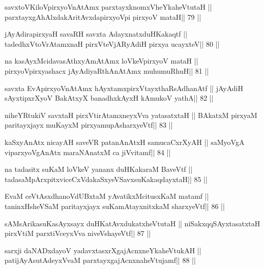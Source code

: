 \begin{shl}
savxtoV\s KiloV\s pirxyoV\s nAtAmx parxtayxknomxVheYkaheVtutaH ||
parxtayxgAhAlxdakAritAvxdapirxyoV\s pi pirxyoV mataH\hfill || 79 ||
\end{shl}

\begin{shl}
jAyAdirapirxyaH savaRH savxta AdayxnatxduHKakaqtf ||
tadedhxVtoVrAtamxnaH pirxVteVjARyAdiH pirxya ucayxteV\hfill || 80 ||
\end{shl}

\begin{shl}
na kasAyxMcidavasAthxyAmAtAmx loVkeV\s pirxyoV mataH ||
pirxyoV\s pirxyashacx jAyAdiyaRthA\s nAtAmx muhumuRhuH\hfill || 81 ||
\end{shl}

\begin{shl}
savxta EvApirxyoV\s nAtAmx hAyxtamxpirxVtayxthaRsAdhanAtf ||
jAyAdiH sAyxtipxrXyoV BakAtxyX banadhxkAyxH kAmukoV yathA\hfill || 82 ||
\end{shl}

\begin{shl}
niheYRtukiV savxtaH pirxVtirAtamxneyxVva yatasatxtaH ||
BAkatxM pirxyaM paritayxjayx muKayxM pirxyamupAsharxyeVtf\hfill || 83 ||
\end{shl}

\begin{shl}
kaSxyAnAtx nicayAH saveVR patanAnAtxH samucaCxrXyAH ||
saMyoVgA viparxyoVgAnAtx maraNAnatxM ca jiVvitamf\hfill || 84 ||
\end{shl}

\begin{shl}
na tadasitx suKaM loVkeV yananx duHKakaraM BaveVtf ||
tadasaMpArxpitxviceCxVdakaSxyeVSavxsuKakaqdayxtaH\hfill || 85 ||
\end{shl}

\begin{shl}
EvaM ceVtAsxdhanoVdUBxtaM yAvatikxMcitusxKaM matamf ||
taninxHsheVSaM paritayxjayx suKamAtayxnitxkaM sharxyeVtf\hfill || 86 ||
\end{shl}

\begin{shl}
sAMsArikasuKasAyxsayx duHKatAvxdukatxheVtutaH ||
niSakxqqSAyxtasatxtaH pirxVtiM parxtiVceyxVva niveVshayeVtf\hfill || 87 ||
\end{shl}

\begin{shl}
sarxji daNADxdayoV yadavxtasxrXgajAcnxneYkaheVtukAH ||
patijAyAsutAdeyxVvaM parxtayxgajAcnxnaheVtujamf\hfill || 88 ||
\end{shl}

